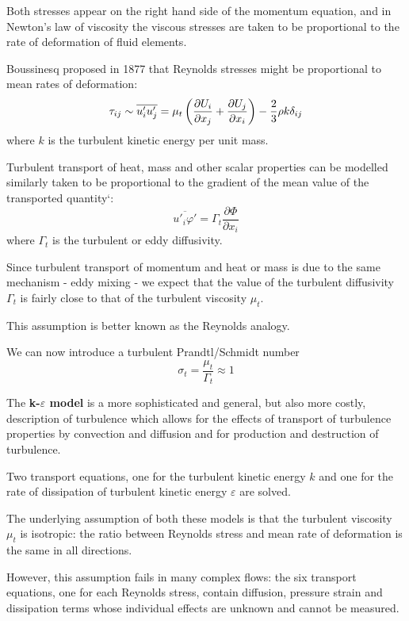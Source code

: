 \documentclass[a4paper, 15pt]{article}
\begin{document}
Both
stresses appear on the right hand side of the momentum equation, and in Newton’s law of
viscosity the viscous stresses are taken to be proportional to the rate of deformation of fluid
elements. 

Boussinesq
proposed in 1877 that Reynolds stresses might be proportional to mean rates of
deformation:
\[\tau_{ij} \sim \overline{u'_iu_j'} = \mu_t\left(\dfrac{\partial U_i}{\partial x_j} + \dfrac{\partial U_j}{\partial x_i}\right) - {2\over3}\rho k\delta_{ij}\]
where
$k$ is the turbulent kinetic energy per unit mass. \newline 


Turbulent
transport of heat, mass and other scalar properties can be modelled similarly  taken to be proportional to the gradient of the mean value of
the transported quantity`:
\[\overline{u'_i\varphi'} = \Gamma_t\dfrac{\partial \Phi}{\partial x_i}\]
where $\Gamma_t$ is the turbulent or eddy diffusivity. \newline 

Since
turbulent transport of momentum and heat or mass is due to the same mechanism  - eddy
mixing - we expect that the value of the turbulent diffusivity $\Gamma_t$ is fairly close to that of the
turbulent viscosity $\mu_t$. 

This
assumption is better known as the Reynolds analogy. 

We can now introduce a turbulent
Prandtl/Schmidt number 
\[\sigma_t = \dfrac{\mu_t}{\Gamma_t} \approx 1\]

The
\textbf{k-$\varepsilon$ model} is a more sophisticated and general, but also more costly, description of
turbulence which allows for the effects of transport of turbulence properties by convection and
diffusion and for production and destruction of turbulence.

Two
transport equations, one for the turbulent kinetic energy $k$ and one for the
rate of dissipation of turbulent kinetic energy $\varepsilon$ are solved. 

The
underlying assumption of both these models is that the turbulent viscosity $\mu_t$ is isotropic: the ratio between Reynolds stress and mean rate of deformation is the same in
all directions. 

However, this
assumption fails in many complex flows: the
six transport equations, one for each Reynolds stress, contain diffusion, pressure strain and dissipation terms whose individual effects are unknown and cannot be measured. \newline 
\end{document}
